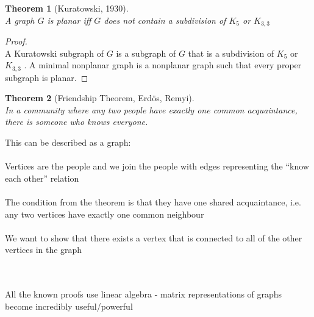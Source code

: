 \documentclass[]{article}
\newtheorem{thm}{Theorem}[section]
\theoremstyle{definition}
\theoremstyle{remark}
\numberwithin{equation}{section}
\begin{document}
		\begin{thm}[Kuratowski, 1930]\hfill\\
		A graph $G$ is planar iff $G$ does not contain a subdivision of $K_5$ or $K_{3,3}$
		\end{thm}
		\begin{proof}\hfill\\
		A Kuratowski subgraph of $G$ is a subgraph of $G$ that is a subdivision of $K_5$ or $K_{3,3}$ . A minimal nonplanar graph is a nonplanar graph such that every proper subgraph is planar.
		\end{proof}

		\begin{thm}[Friendship Theorem, Erdös, Remyi]\hfill\\
		In a community where any two people have exactly one common acquaintance, there is someone who knows everyone.
		\end{thm}
		This can be described as a graph:\\
		\\
		Vertices are the people and we join the people with edges representing the “know each other” relation\\
		\\
		The condition from the theorem is that they have one shared acquaintance, i.e. any two vertices have exactly one common neighbour\\
		\\
		We want to show that there exists a vertex that is connected to all of the other vertices in the graph\\
		\\
		\\
		All the known proofs use linear algebra - matrix representations of graphs become incredibly useful/powerful\\
\end{document}
